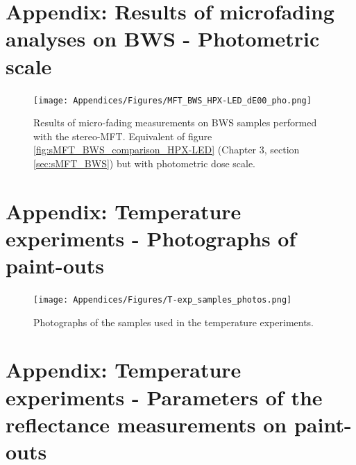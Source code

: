 \begin{appendices}

\newpage
\section[\hspace{0.3cm}Microfading analyses on BWS - Photometric scale]{ Appendix: Results of microfading analyses on BWS - Photometric scale}
\label{app:ch3_MFT_BWS-data_photometric}


\begin{figure}[!h]
\centering
\texttt{[image: Appendices/Figures/MFT\_BWS\_HPX-LED\_dE00\_pho.png]}
\caption*{Results of micro-fading measurements on \gls{BWS} samples performed with the stereo-MFT. Equivalent of figure \ref{fig:sMFT_BWS_comparison_HPX-LED} (Chapter 3, section \ref{sec:sMFT_BWS}) but with photometric dose scale.}
\label{fig:sMFT_3Dprints_1-4_photos}
\end{figure}



\newpage
\section[\hspace{0.3cm}Temperature experiments - Photographs of paint-outs]{ Appendix: Temperature experiments - Photographs of paint-outs}
\label{app:ch3_T-exp_photos_PO}

\begin{figure}[!h]
\centering
\texttt{[image: Appendices/Figures/T-exp\_samples\_photos.png]}
\caption*{Photographs of the samples used in the temperature experiments.}
\end{figure}  




\newpage
\section[\hspace{0.3cm}Temperature experiments - Methodology reflectance measurements]{ Appendix: Temperature experiments - Parameters of the reflectance measurements on paint-outs}
\label{app:ch3_T-exp_RS_PO}


\end{appendices}

